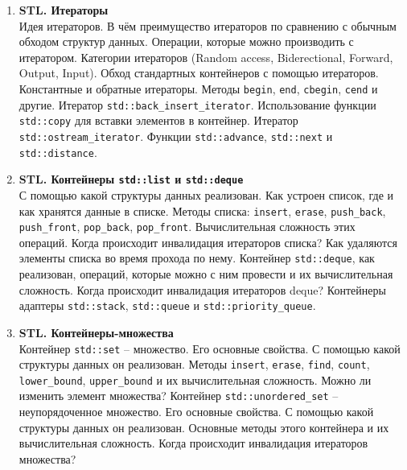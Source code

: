 \documentclass{article}
\begin{document}
\begin{enumerate}
\item \textbf{STL. Итераторы}\\
Идея итераторов. В чём преимущество итераторов по сравнению с обычным обходом структур данных. Операции, которые можно производить с итератором. Категории итераторов (Random access, Biderectional, Forward, Output, Input). Обход стандартных контейнеров с помощью итераторов. Константные и обратные итераторы. Методы \texttt{begin}, \texttt{end}, \texttt{cbegin}, \texttt{cend} и другие. Итератор \texttt{std::back\_insert\_iterator}. Использование функции \texttt{std::copy} для вставки элементов в контейнер. Итератор \texttt{std::ostream\_iterator}. Функции \texttt{std::advance}, \texttt{std::next} и \texttt{std::distance}. 

\item \textbf{STL. Контейнеры \texttt{std::list} и \texttt{std::deque}}\\
С помощью какой структуры данных реализован. Как устроен список, где и как хранятся данные в списке. Методы списка: \texttt{insert}, \texttt{erase}, \texttt{push\_back}, \texttt{push\_front}, \texttt{pop\_back}, \texttt{pop\_front}. Вычислительная сложность этих операций. Когда происходит инвалидация итераторов списка? Как удаляются элементы списка во время прохода по нему. Контейнер \texttt{std::deque}, как реализован, операций, которые можно с ним провести и их вычислительная сложность. Когда происходит инвалидация итераторов deque? Контейнеры адаптеры \texttt{std::stack}, \texttt{std::queue} и \texttt{std::priority\_queue}.

\item \textbf{STL. Контейнеры-множества}\\
Контейнер \texttt{std::set} -- множество. Его основные свойства. С помощью какой структуры данных он реализован. Методы \texttt{insert}, \texttt{erase}, \texttt{find}, \texttt{count}, \texttt{lower\_bound}, \texttt{upper\_bound} и их вычислительная сложность. Можно ли изменить элемент множества? Контейнер \texttt{std::unordered\_set} -- неупорядоченное множество. Его основные свойства. С помощью какой структуры данных он реализован. Основные методы этого контейнера и их вычислительная сложность. Когда происходит инвалидация итераторов множества?


\end{enumerate}
\end{document}
